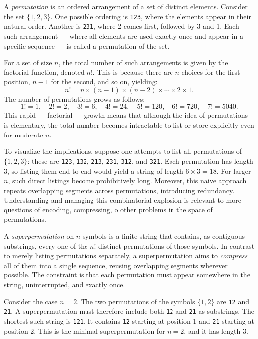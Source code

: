 A \emph{permutation} is an ordered arrangement of a set of distinct elements. Consider the set $\{1, 2, 3\}$. One possible ordering is \texttt{123}, where the elements appear in their natural order. Another is \texttt{231}, where 2 comes first, followed by 3 and 1. Each such arrangement — where all elements are used exactly once and appear in a specific sequence — is called a permutation of the set.

For a set of size $n$, the total number of such arrangements is given by the factorial function, denoted $n!$. This is because there are $n$ choices for the first position, $n-1$ for the second, and so on, yielding:
\[
n! = n \times (n-1) \times (n-2) \times \cdots \times 2 \times 1.
\]
The number of permutations grows as follows:
\[
1! = 1,\quad 2! = 2,\quad 3! = 6,\quad 4! = 24,\quad 5! = 120,\quad 6! = 720,\quad 7! = 5040.
\]
This rapid — factorial — growth means that although the idea of permutations is elementary, the total number becomes intractable to list or store explicitly even for moderate $n$.

To visualize the implications, suppose one attempts to list all permutations of $\{1, 2, 3\}$: these are \texttt{123}, \texttt{132}, \texttt{213}, \texttt{231}, \texttt{312}, and \texttt{321}. Each permutation has length 3, so listing them end-to-end would yield a string of length $6 \times 3 = 18$. For larger $n$, such direct listings become prohibitively long. Moreover, this naive approach repeats overlapping segments across permutations, introducing redundancy. Understanding and managing this combinatorial explosion is relevant to more questions of encoding, compressing, o other problems in the space of permutations.

A \emph{superpermutation} on $n$ symbols is a finite string that contains, as contiguous substrings, every one of the $n!$ distinct permutations of those symbols. In contrast to merely listing permutations separately, a superpermutation aims to \emph{compress} all of them into a single sequence, reusing overlapping segments wherever possible. The constraint is that each permutation must appear somewhere in the string, uninterrupted, and exactly once.

Consider the case $n = 2$. The two permutations of the symbols $\{1, 2\}$ are \texttt{12} and \texttt{21}. A superpermutation must therefore include both \texttt{12} and \texttt{21} as substrings. The shortest such string is \texttt{121}. It contains \texttt{12} starting at position 1 and \texttt{21} starting at position 2. This is the minimal superpermutation for $n = 2$, and it has length 3.

